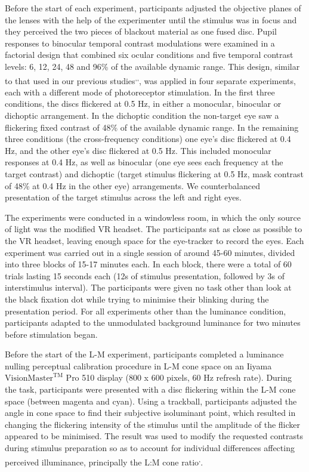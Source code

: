 \documentclass[
]{article}
\begin{document}
Before the start of each experiment, participants adjusted the objective planes of the lenses with the help of the experimenter until the stimulus was in focus and they perceived the two pieces of blackout material as one fused disc. Pupil responses to binocular temporal contrast modulations were examined in a factorial design that combined six ocular conditions and five temporal contrast levels: 6, 12, 24, 48 and 96\% of the available dynamic range. This design, similar to that used in our previous studies\textsuperscript{,,}, was applied in four separate experiments, each with a different mode of photoreceptor stimulation. In the first three conditions, the discs flickered at 0.5 Hz, in either a monocular, binocular or dichoptic arrangement. In the dichoptic condition the non-target eye saw a flickering fixed contrast of 48\% of the available dynamic range. In the remaining three conditions (the cross-frequency conditions) one eye's disc flickered at 0.4 Hz, and the other eye's disc flickered at 0.5 Hz. This included monocular responses at 0.4 Hz, as well as binocular (one eye sees each frequency at the target contrast) and dichoptic (target stimulus flickering at 0.5 Hz, mask contrast of 48\% at 0.4 Hz in the other eye) arrangements. We counterbalanced presentation of the target stimulus across the left and right eyes.

The experiments were conducted in a windowless room, in which the only source of light was the modified VR headset. The participants sat as close as possible to the VR headset, leaving enough space for the eye-tracker to record the eyes. Each experiment was carried out in a single session of around 45-60 minutes, divided into three blocks of 15-17 minutes each. In each block, there were a total of 60 trials lasting 15 seconds each (12s of stimulus presentation, followed by 3s of interstimulus interval). The participants were given no task other than look at the black fixation dot while trying to minimise their blinking during the presentation period. For all experiments other than the luminance condition, participants adapted to the unmodulated background luminance for two minutes before stimulation began.

Before the start of the L-M experiment, participants completed a luminance nulling perceptual calibration procedure in L-M cone space on an Iiyama \(\textrm{VisionMaster}^{\textrm{TM}}\) Pro 510 display (800 x 600 pixels, 60 Hz refresh rate). During the task, participants were presented with a disc flickering within the L-M cone space (between magenta and cyan). Using a trackball, participants adjusted the angle in cone space to find their subjective isoluminant point, which resulted in changing the flickering intensity of the stimulus until the amplitude of the flicker appeared to be minimised. The result was used to modify the requested contrasts during stimulus preparation so as to account for individual differences affecting perceived illuminance, principally the L:M cone ratio\textsuperscript{,}.
\end{document}
